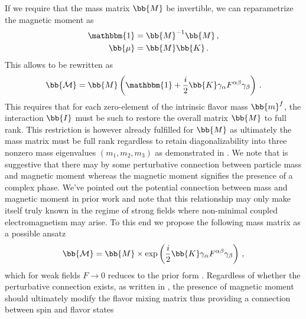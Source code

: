 If we require that the mass matrix $\bb{M}$ be invertible, we can reparametrize the magnetic moment as 
\begin{alignat}{1}
	\label{mass:eq:07a}  \mathbbm{1} &= \bb{M}^{-1}\bb{M}\,,\\
	\label{mass:eq:07b} \bb{\mu} &= \bb{M}\bb{K}\,.
\end{alignat}
This allows  to be rewritten as
\begin{alignat}{1}
	\label{mass:eq:08} {\bb{\mathcal{M}}} = \bb{M}\left(\mathbbm{1} + \frac{i}{2}\bb{K}\gamma_{\alpha}F^{\alpha\beta}\gamma_{\beta}\right)\,.
\end{alignat}
This requires that for each zero-element of the intrinsic flavor mass $\bb{m}^{f}$, the interaction $\bb{I}$ must be such to restore the overall matrix $\bb{M}$ to full rank. This restriction is however already fulfilled for $\bb{M}$ as ultimately the mass matrix must be full rank regardless to retain diagonalizability into three nonzero mass eigenvalues $(m_{1}, m_{2}, m_{3})$ as demonstrated in . We note that  is suggestive that there may by some perturbative connection between particle mass and magnetic moment whereas the magnetic moment signifies the presence of a complex phase. We've pointed out the potential connection between mass and magnetic moment in prior work and note that this relationship may only make itself truly known in the regime of strong fields where non-minimal coupled electromagnetism may arise. To this end we propose the following mass matrix as a possible ansatz
\begin{alignat}{1}
	\label{mass:eq:10} {\bb{\mathcal{M}}} = \bb{M}\times\mathrm{exp}\left(\frac{i}{2}\bb{K}\gamma_{\alpha}F^{\alpha\beta}\gamma_{\beta}\right)\,,
\end{alignat}
which for weak fields $F\rightarrow0$ reduces to the prior form . Regardless of whether the perturbative connection exists, as written in , the presence of magnetic moment should ultimately modify the flavor mixing matrix thus providing a connection between spin and flavor states

